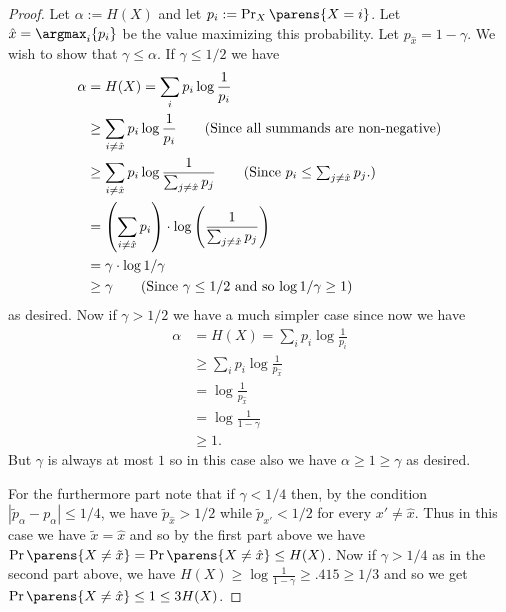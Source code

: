 \documentclass[11pt]{article}
\begin{document}
\begin{proof}
	Let $\alpha := H(X)$ and let $p_i := \Pr_X \parens{ X = i}$.
	Let $\hat x = \argmax_i \{p_i\}$ be the
	value maximizing this probability.
	Let $p_{\hat x} = 1 - \gamma$. We wish to show that
	$\gamma \leq \alpha$.
	If $\gamma \leq 1/2$ we have
	\begin{align*}
		\alpha
		&=  H(X) = \sum_i p_i \log \frac1{p_i} \\
		& \geq  \sum_{i \ne \hat x} p_i \log \frac1{p_i} \tag{Since all summands are non-negative}\\
		& \geq  \sum_{i \ne \hat x} p_i \log \frac1{\sum_{j\ne \hat x} p_j} \tag{Since $p_i \leq \sum_{j\ne \hat x}
			p_j$.}\\
		& =  \left( \sum_{i \ne \hat x} p_i \right) \cdot \log \left( \frac1{\sum_{j\ne \hat x} p_j} \right)\\
		& =  \gamma \cdot \log 1/\gamma \\
		& \geq  \gamma \tag{Since $\gamma \leq 1/2$ and so $\log 1/\gamma \geq 1$}
	\end{align*}
	as desired. Now if $\gamma > 1/2$ we have a much simpler case since now we have
	\begin{align*}
		\alpha
		&=  H(X) =  \sum_i p_i \log \frac1{p_i} \\
		& \geq  \sum_i p_i \log \frac1{p_{\hat x}} \tag{Since $p_i \leq p_x$} \\
		& =  \log \frac1{p_{\hat x}} \tag{Since $\sum_i p_i =1$} \\
		& =  \log \frac1{1-\gamma}\\ 
		& \geq  1. \tag{Since $\gamma \geq 1/2$}
	\end{align*}
	But $\gamma$ is always at most $1$ so in this case also we have $\alpha \geq 1 \geq \gamma$ as desired.
	
	For the furthermore part note that if $\gamma < 1/4$ then, by the condition $|\tilde{p}_\alpha - p_\alpha|\leq 1/4$, we have $\tilde{p}_{\hat{x}} > 1/2$ while $\tilde{p}_{x'} < 1/2$ for every $x' \ne \hat{x}$. Thus in this case we have $\tilde{x} = \hat{x}$ and so by the first part above we have $\Pr\parens{X \neq \tilde{x}} = \Pr\parens{X \neq \hat{x}}\leq H(X)$.
		Now if $\gamma > 1/4$ as in the second part above, we have $H(X) \geq \log\frac1{1-\gamma} \geq .415 \geq 1/3$ and so we get 
		$\Pr\parens{X \neq \hat{x}}\leq 1 \leq 3 H(X)$.
	\end{proof}
\end{document}
